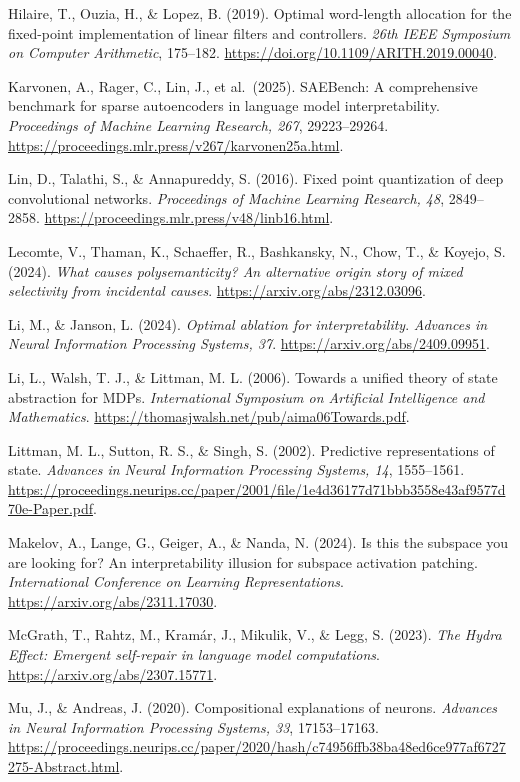 \documentclass[
  british,
  11pt,
  a4paper,
]{article}
\begin{document}
Hilaire, T., Ouzia, H., \& Lopez, B. (2019). Optimal word-length
allocation for the fixed-point implementation of linear filters and
controllers. \emph{26th IEEE Symposium on Computer Arithmetic},
175--182. \url{https://doi.org/10.1109/ARITH.2019.00040}.

Karvonen, A., Rager, C., Lin, J., et al.~(2025). SAEBench: A
comprehensive benchmark for sparse autoencoders in language model
interpretability. \emph{Proceedings of Machine Learning Research, 267},
29223--29264. \url{https://proceedings.mlr.press/v267/karvonen25a.html}.

Lin, D., Talathi, S., \& Annapureddy, S. (2016). Fixed point
quantization of deep convolutional networks. \emph{Proceedings of
Machine Learning Research, 48}, 2849--2858.
\url{https://proceedings.mlr.press/v48/linb16.html}.

Lecomte, V., Thaman, K., Schaeffer, R., Bashkansky, N., Chow, T., \&
Koyejo, S. (2024). \emph{What causes polysemanticity? An alternative
origin story of mixed selectivity from incidental causes}.
\url{https://arxiv.org/abs/2312.03096}.

Li, M., \& Janson, L. (2024). \emph{Optimal ablation for
interpretability}. \emph{Advances in Neural Information Processing
Systems, 37}. \url{https://arxiv.org/abs/2409.09951}.

Li, L., Walsh, T. J., \& Littman, M. L. (2006). Towards a unified theory
of state abstraction for MDPs. \emph{International Symposium on
Artificial Intelligence and Mathematics}.
\url{https://thomasjwalsh.net/pub/aima06Towards.pdf}.

Littman, M. L., Sutton, R. S., \& Singh, S. (2002). Predictive
representations of state. \emph{Advances in Neural Information
Processing Systems, 14}, 1555--1561.
\url{https://proceedings.neurips.cc/paper/2001/file/1e4d36177d71bbb3558e43af9577d70e-Paper.pdf}.

Makelov, A., Lange, G., Geiger, A., \& Nanda, N. (2024). Is this the
subspace you are looking for? An interpretability illusion for subspace
activation patching. \emph{International Conference on Learning
Representations}. \url{https://arxiv.org/abs/2311.17030}.

McGrath, T., Rahtz, M., Kramár, J., Mikulik, V., \& Legg, S. (2023).
\emph{The Hydra Effect: Emergent self-repair in language model
computations}. \url{https://arxiv.org/abs/2307.15771}.

Mu, J., \& Andreas, J. (2020). Compositional explanations of neurons.
\emph{Advances in Neural Information Processing Systems, 33},
17153--17163.
\url{https://proceedings.neurips.cc/paper/2020/hash/c74956ffb38ba48ed6ce977af6727275-Abstract.html}.
\end{document}
